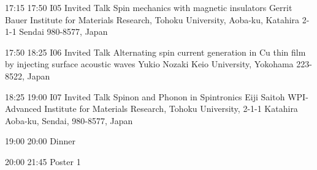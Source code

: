  

\begin{talk}
{17:15}
{17:50}
{I05}
{Invited Talk}
{Spin mechanics with magnetic insulators}
{Gerrit Bauer}
{Institute for Materials Research, Tohoku University, Aoba-ku, Katahira 2-1-1 Sendai 980-8577, Japan}
\end{talk}

\begin{talk}
{17:50}
{18:25}
{I06}
{Invited Talk}
{Alternating spin current generation in Cu thin film by injecting surface acoustic waves}
{Yukio Nozaki}
{Keio University, Yokohama 223-8522, Japan}
\end{talk}

\begin{talk}
{18:25}
{19:00}
{I07}
{Invited Talk}
{Spinon and Phonon in Spintronics}
{Eiji Saitoh}
{WPI-Advanced Institute for Materials Research, Tohoku University, 2-1-1 Katahira Aoba-ku, Sendai, 980-8577, Japan}
\end{talk}

\begin{confbreak}
{19:00}
{20:00}
{Dinner}
\end{confbreak}

\begin{confbreak}
{20:00}
{21:45}
{Poster 1}
\end{confbreak}

